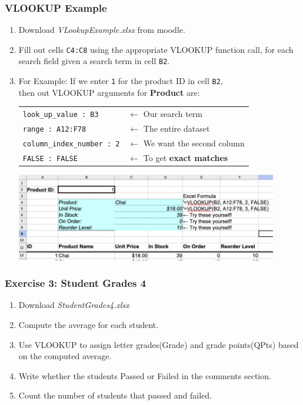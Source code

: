 \documentclass[12pt]{beamer}
\begin{document}
\begin{frame}
	\frametitle{VLOOKUP Example}
	\begin{enumerate}
	\item Download \textit{VLookupExample.xlsx} from moodle.
	\item Fill out cells \texttt{C4:C8} using the appropriate VLOOKUP function call, for each search field given a search term in cell \texttt{B2}. 
	\item For Example: If we enter \texttt{1} for the product ID in cell \texttt{B2},\\  then out VLOOKUP arguments for \textbf{Product} are:
		\begin{tabular}{l l }
		 	\texttt{look\_up\_value : B3}& $\leftarrow$ Our search term\\
		 	\texttt{range : A12:F78}& $\leftarrow$  The entire dataset\\
		 	\texttt{column\_index\_number : 2} &$\leftarrow$ We want the second column\\
		 	\texttt{FALSE : FALSE}& $\leftarrow$ To get \textbf{exact matches}\\
		 \end{tabular}

	 	\includegraphics[width =0.9\textwidth ]{VLOOKUPEx.png}
	\end{enumerate}
\end{frame}
\begin{frame}
	\frametitle{Exercise 3: Student Grades 4}
	\begin{enumerate}
		\item Download \textit{StudentGrades4.xlsx}
		\item Compute the average for each student.
		\item Use VLOOKUP to assign letter grades(Grade) and grade points(QPts) based on the computed average.
		\item Write whether the students Passed or Failed in the comments section. 
		\item Count the number of students that passed and failed. 
	\end{enumerate}
\end{frame}
\end{document}
